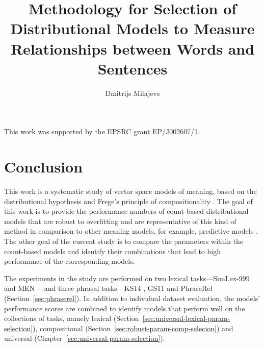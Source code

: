 \documentclass[11pt,a4paper,english,oneside]{book}
\title{Methodology for Selection of Distributional Models to Measure Relationships between Words and Sentences}
\author{Dmitrijs Milajevs}
\renewcommand\cite\citep
\begin{document}
\maketitle
\addtocounter{page}{1}


\cleardoublepage

\vspace*{\fill}
\begin{center}
This work was supported by the EPSRC grant EP/J002607/1.
\end{center}
\vfill



\cleardoublepage

\tableofcontents

\cleardoublepage
\listoffigures

\cleardoublepage
\listoftables









\chapter{Conclusion}

This work is a systematic study of vector space models of meaning, based on the distributional hypothesis \cite{harris1954distributional} and Frege's principle of compositionality \cite{Janssen2001,DBLP:journals/corr/abs-1003-4394}. The goal of this work is to provide the performance numbers of count-based distributional models that are robust to overfitting and are representative of this kind of method in comparison to other meaning models, for example, predictive models \cite{mikolov2013efficient}. The other goal of the current study is to compare the parameters within the count-based models and identify their combinations that lead to high performance of the corresponding models.

The experiments in the study are performed on two lexical tasks---SimLex-999 \cite{hill2014simlex} and MEN \cite{Bruni:2014:MDS:2655713.2655714}---and three phrasal tasks---KS14 \cite{kartsadrqpl2014}, GS11 \cite{Grefenstette:2011:ETV:2140490.2140497} and PhraseRel (Section~\ref{sec:phraserel}). In addition to individual dataset evaluation, the models' performance scores are combined to identify models that perform well on the collections of tasks, namely lexical (Section~\ref{sec:universal-lexical-param-selection}), compositional (Section~\ref{sec:robust-param-comp-selecion}) and universal (Chapter~\ref{sec:universal-param-selection}).
\end{document}
